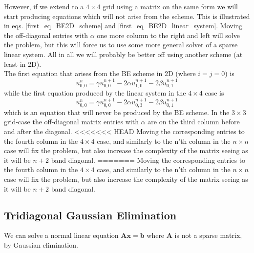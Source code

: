 However, if we extend to a $4\times4$ grid using a matrix on the same form we will start producing equations which will not arise from the scheme. 
This is illustrated in eqs. \ref{first_eq_BE2D_scheme} and \ref{first_eq_BE2D_linear_system}. 
Moving the off-diagonal entries with $\alpha$ one more column to the right and left will solve the problem, but this will force us to use some more general solver of a sparse linear system. 
All in all we will probably be better off using another scheme (at least in 2D).\\
The first equation that arises from the BE scheme in 2D (where $i=j=0$) is
\begin{equation}\label{first_eq_BE2D_scheme}
 u^n_{0,0} = \gamma u^{n+1}_{0,0}-2\alpha u^{n+1}_{1,0} -2\beta u^{n+1}_{0,1}
\end{equation}
while the first equation produced by the linear system in the $4\times4$ case is 
\begin{equation}\label{first_eq_BE2D_linear_system}
 u^n_{0,0} = \gamma u^{n+1}_{0,0}-2\alpha u^{n+1}_{0,3} -2\beta u^{n+1}_{0,1}
\end{equation}
which is an equation that will never be produced by the BE scheme. 
In the $3\times3$ grid-case the off-diagonal matrix entries with $\alpha$ are on the third column before and after the diagonal. 
<<<<<<< HEAD
Moving the corresponding entries to the fourth column in the $4\times4$ case, and similarly to the n'th column in the $n\times n$ case will fix the problem, but also increase the complexity of the matrix seeing as it will be $n+2$ band diagonal.
=======
Moving the corresponding entries to the fourth column in the $4\times4$ case, and similarly to the n'th column in the $n\times n$ case will fix the problem, but also increase the complexity of the matrix seeing as it will be $n+2$ band diagonal.

\subsection{Tridiagonal Gaussian Elimination}

We can solve a normal linear equation $\mathbf{A}\mathbf{x} = \mathbf{b}$ where $\mathbf{A}$ is not a sparse matrix, by Gaussian elimination.

